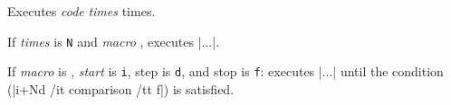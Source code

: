 Executes {\it code} {\it times} times.
\emacroexp

If {\it times} is {\tt N} and {\it macro} \macro\X, executes \inlinecode|...|.
\emacroexp

If {\it macro} is \macro\X, {\it start} is {\tt i}, step is {\tt d}, and stop is {\tt f}: executes \inlinecode|...| until the condition (\inlinecode|i+Nd /it comparison /tt f|) is satisfied.
\emacroexp

